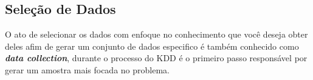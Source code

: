 \subsection{Seleção de Dados}
O ato de selecionar os dados com enfoque no conhecimento que você deseja obter deles afim de gerar um conjunto de dados especifico é também conhecido como \textit{\textbf{data collection}}, durante o processo do KDD é o primeiro passo responsável por gerar um amostra mais focada no problema.
